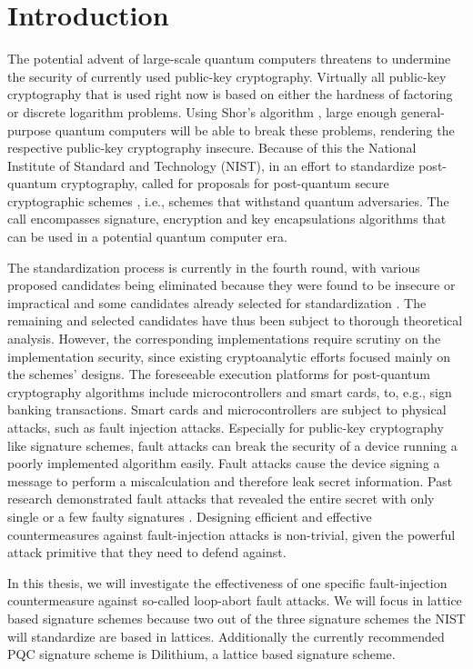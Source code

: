 %

\chapter{Introduction}
The potential advent of large-scale quantum computers threatens to undermine the security of currently used public-key cryptography. Virtually all public-key cryptography that is used right now is based on either the hardness of factoring or discrete logarithm problems. Using Shor's algorithm \cite{shor}, large enough general-purpose quantum computers will be able to break these problems, rendering the respective public-key cryptography insecure.
Because of this the National Institute of Standard and Technology (NIST), in an effort to standardize post-quantum  cryptography, called for proposals for post-quantum secure cryptographic schemes \cite{nistcall}, i.e., schemes that withstand quantum adversaries. The call encompasses signature, encryption and key encapsulations algorithms that can be used in a potential quantum computer era.

The standardization process is currently in the fourth round, with various proposed candidates being eliminated because they were found to be insecure or impractical and some candidates already selected for standardization \cite{niststatus}. The remaining and selected candidates have thus been subject to thorough theoretical analysis.  However, the corresponding implementations require scrutiny on the implementation security, since existing cryptoanalytic efforts focused mainly on the schemes' designs. The foreseeable execution platforms for post-quantum cryptography algorithms include microcontrollers and smart cards, to, e.g., sign banking transactions. Smart cards and microcontrollers are subject to physical attacks, such as fault injection attacks. Especially for public-key cryptography like signature schemes, fault attacks can break the security of a device running a poorly implemented algorithm easily. 
Fault attacks cause the device signing a message to perform a miscalculation and therefore leak secret information. Past research demonstrated fault attacks that revealed  the entire secret with only single or a few faulty signatures \cite{faultseifert}. Designing efficient and effective countermeasures against fault-injection attacks is non-trivial, given the powerful attack primitive that they need to defend against. 

In this thesis, we will investigate the effectiveness of one specific fault-injection countermeasure against so-called loop-abort fault attacks.
We will focus in lattice based signature schemes because two out of the three signature schemes the NIST will standardize are based in lattices. Additionally the currently recommended PQC signature scheme is Dilithium, a lattice based signature scheme.

